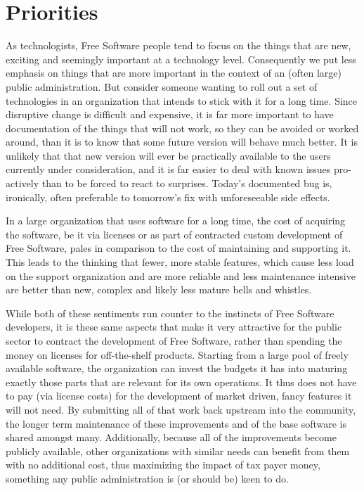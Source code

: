 \section*{Priorities}

As technologists, Free Software people tend to focus on the things that are
new, exciting and seemingly important at a technology level. Consequently we
put less emphasis on things that are more important in the context of an (often
large) public administration. But consider someone wanting to roll out a
set of technologies in an organization that intends to stick with it for a long
time. Since disruptive change is difficult and expensive, it is far more
important to have documentation of the things that will not work, so they can
be avoided or worked around, than it is to know that some future version will
behave much better. It is unlikely that that new version will ever be
practically available to the users currently under consideration, and it is far
easier to deal with known issues pro-actively than to be forced to react to
surprises.  Today's documented bug is, ironically, often preferable to
tomorrow's fix with unforeseeable side effects.

In a large organization that uses software for a long time, the cost of acquiring
the software, be it via licenses or as part of contracted custom development of
Free Software, pales in comparison to the cost of maintaining and supporting it.
This leads to the thinking that fewer, more stable features, which cause less load
on the support organization and are more reliable and less maintenance intensive
are better than new, complex and likely less mature bells and whistles.

While both of these sentiments run counter to the instincts of Free Software
developers, it is these same aspects that make it very attractive for the
public sector to contract the development of Free Software, rather than
spending the money on licenses for off-the-shelf products. Starting from a
large pool of freely available software, the organization can invest the
budgets it has into maturing exactly those parts that are relevant for its own
operations. It thus does not have to pay (via license costs) for the development of
market driven, fancy features it will not need. By submitting all of that work
back upstream into the community, the longer term maintenance of these
improvements and of the base software is shared amongst many. Additionally,
because all of the improvements become publicly available, other
organizations with similar needs can benefit from them with no
additional cost, thus maximizing the impact of tax payer money,
something any public administration is (or should be) keen to do.

